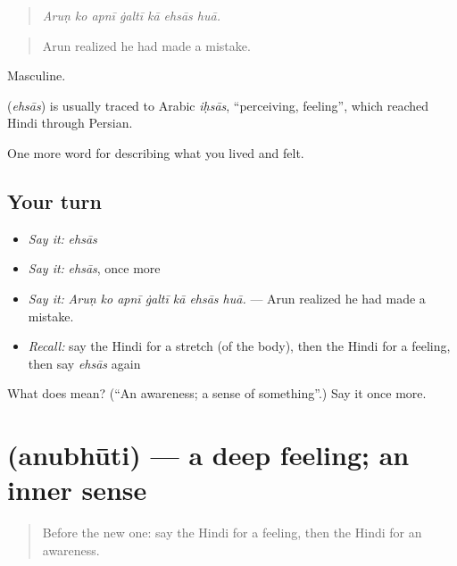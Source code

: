\begin{quote}
\emph{Aruṇ ko apnī ġaltī kā ehsās huā.}
\end{quote}

\begin{quote}
Arun realized he had made a mistake.
\end{quote}

Masculine.

\begin{cousinweb}
\textbf{} (\emph{ehsās}) is usually traced to Arabic \emph{iḥsās}, \textquotedblleft{}perceiving, feeling\textquotedblright{}, which reached Hindi through Persian.
\end{cousinweb}

\begin{grammarlens}[title={What you've built}]
One more word for describing what you lived and felt.
\end{grammarlens}

\subsection*{Your turn}
\begin{itemize}
\raggedright
  \item \emph{Say it:} \emph{ehsās}
  \item \emph{Say it:} \emph{ehsās}, once more
  \item \emph{Say it:} \emph{Aruṇ ko apnī ġaltī kā ehsās huā.} — Arun realized he had made a mistake.
  \item \emph{Recall:} say the Hindi for a stretch (of the body), then the Hindi for a feeling, then say \emph{ehsās} again
\end{itemize}

\begin{tcolorbox}[breakable,colback=teal!4,colframe=teal!35!black,title={Before you move on}]
What does  mean? (\textquotedblleft{}An awareness; a sense of something\textquotedblright{}.) Say it once more.
\end{tcolorbox}
\section[\texorpdfstring{\hi{अनुभूति} (anubhūti)}{अनुभूति (anubhūti)}]{ (anubhūti) — a deep feeling; an inner sense}

\label{lesson:HI-C452-anubhuti}



\begin{quote}
Before the new one: say the Hindi for a feeling, then the Hindi for an awareness.
\end{quote}

